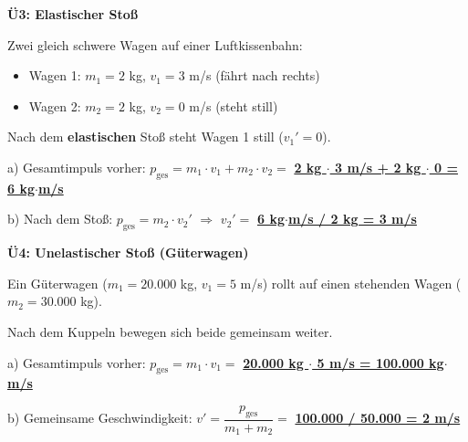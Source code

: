 \documentclass[11pt,a4paper]{article}
\newcommand{\lsg}[1]{\textcolor{loesung}{\underline{\textbf{#1}}}}
\begin{document}
\textbf{Ü3: Elastischer Stoß}

\vspace{3mm}

Zwei gleich schwere Wagen auf einer Luftkissenbahn:
\begin{itemize}[leftmargin=*, itemsep=2pt]
    \item Wagen 1: $m_1 = 2$ kg, $v_1 = 3$ m/s (fährt nach rechts)
    \item Wagen 2: $m_2 = 2$ kg, $v_2 = 0$ m/s (steht still)
\end{itemize}

Nach dem \textbf{elastischen} Stoß steht Wagen 1 still ($v_1' = 0$).

\vspace{5pt}

a) Gesamtimpuls vorher: $p_{\text{ges}} = m_1 \cdot v_1 + m_2 \cdot v_2 = $ \lsg{2 kg $\cdot$ 3 m/s + 2 kg $\cdot$ 0 = 6 kg$\cdot$m/s}

\vspace{5pt}

b) Nach dem Stoß: $p_{\text{ges}} = m_2 \cdot v_2'$ \hfill $\Rightarrow$ $v_2' = $ \lsg{6 kg$\cdot$m/s / 2 kg = 3 m/s}

\vspace{8mm}


\textbf{Ü4: Unelastischer Stoß (Güterwagen)}

\vspace{3mm}

Ein Güterwagen ($m_1 = 20.000$ kg, $v_1 = 5$ m/s) rollt auf einen stehenden Wagen ($m_2 = 30.000$ kg).

Nach dem Kuppeln bewegen sich beide gemeinsam weiter.

\vspace{5pt}

a) Gesamtimpuls vorher: $p_{\text{ges}} = m_1 \cdot v_1 = $ \lsg{20.000 kg $\cdot$ 5 m/s = 100.000 kg$\cdot$m/s}

\vspace{5pt}

b) Gemeinsame Geschwindigkeit: $v' = \dfrac{p_{\text{ges}}}{m_1 + m_2} = $ \lsg{100.000 / 50.000 = 2 m/s}

\vspace{8mm}

\end{document}
